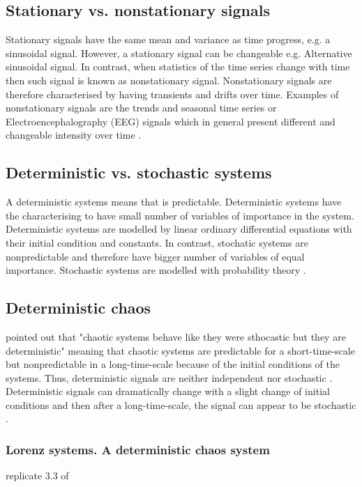 \subsection{Stationary vs. nonstationary signals}
Stationary signals have the same mean and variance as time progress,
e.g. a sinusoidal signal. However, a stationary signal can be changeable 
e.g. Alternative sinusoidal signal.
In contrast, when statistics of the time series change with time then 
such signal is known as nonstationary signal.
Nonstationary signals are therefore characterised by having transients and drifts
over time. Examples of nonstationary signals are the trends and seasonal 
time series \citep{kitagawa1984} or Electroencephalography (EEG) signals which in general 
present different and changeable intensity over time \citep{klonowski2007}.

\subsection{Deterministic vs. stochastic systems}
A deterministic systems means that is predictable.
Deterministic systems have the characterising to 
have small number of variables of importance in the system.
Deterministic systems are modelled by linear ordinary differential equations
with their initial condition and constants.
In contrast, stochatic systems are nonpredictable and therefore have bigger number 
of variables of equal importance.
Stochastic systems are modelled with probability theory \citep{klonowski2007}.

\subsection{Deterministic chaos}

\citealt[p. 11]{klonowski2007} pointed out that 
"chaotic systems behave like they were sthocastic but they are deterministic"
meaning that chaotic systems are predictable for a short-time-scale
but nonpredictable in a long-time-scale because of the initial 
conditions of the systems. 
Thus, deterministic signals are neither independent nor stochastic \citep{stergiou2006, stergiou2011}.
Deterministic signals can dramatically change with a slight change 
of initial conditions and then after a long-time-scale, the
signal can appear to be stochastic \citep{amato1992}.


\subsubsection{Lorenz systems. A deterministic chaos system}
replicate 3.3 of 
\citep{klonowski2007}



